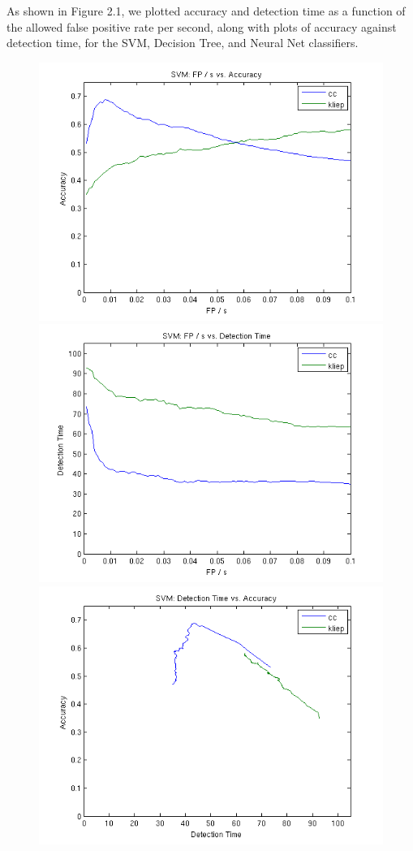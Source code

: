 \documentclass[onehalf,11pt]{beavtex}
\begin{document}
As shown in Figure 2.1, we plotted accuracy and detection time as a function of the allowed
false positive rate per second, along with plots of accuracy against detection
time, for the SVM, Decision Tree, and Neural Net classifiers.

\begin{figure}
 \centering
 \includegraphics[scale=0.3]{svm_fps_acc.png}
 \includegraphics[scale=0.3]{svm_fps_det.png}
 \includegraphics[scale=0.3]{svm_det_acc.png}

\end{figure}
\end{document}
